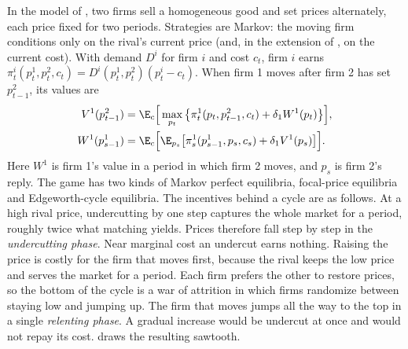 In the model of \citet{MaskinTirole1988}, two firms sell a homogeneous good and set prices alternately, each price
fixed for two periods. Strategies are Markov: the moving firm conditions only on the rival's current price (and,
in the extension of \citet{Noel2007}, on the current cost). With demand $D^i$ for firm $i$ and cost $c_t$, firm
$i$ earns $\pi^i_t(p^1_t,p^2_t,c_t)=D^i(p^1_t,p^2_t)(p^i_t-c_t)$. When firm 1 moves after firm 2 has set
$p^2_{t-1}$, its values are
\begin{align}
V^1(p^2_{t-1})&=\E_c\Big[\max_{p_t}\big\{\pi^1_t(p_t,p^2_{t-1},c_t)+\delta_1W^1(p_t)\big\}\Big],\label{eq:13-mt-v}\\
W^1(p^1_{s-1})&=\E_c\Big[\E_{p_s}\big[\pi^1_s(p^1_{s-1},p_s,c_s)+\delta_1V^1(p_s)\big]\Big].\label{eq:13-mt-w}
\end{align}
Here $W^1$ is firm 1's value in a period in which firm 2 moves, and $p_s$ is firm 2's reply. The game has two
kinds of Markov perfect equilibria, focal-price equilibria and Edgeworth-cycle equilibria. The incentives
behind a cycle are as follows. At a high rival price, undercutting by one step captures the whole market for a
period, roughly twice what matching yields. Prices therefore fall step by step in the \emph{undercutting phase}.
Near marginal cost an undercut earns nothing. Raising the price is costly for the firm that moves first, because
the rival keeps the low price and serves the market for a period. Each firm prefers the other to restore prices,
so the bottom of the cycle is a war of attrition in which firms randomize between staying low and jumping up. The
firm that moves jumps all the way to the top in a single \emph{relenting phase}. A gradual increase would be
undercut at once and would not repay its cost.  draws the resulting sawtooth.

